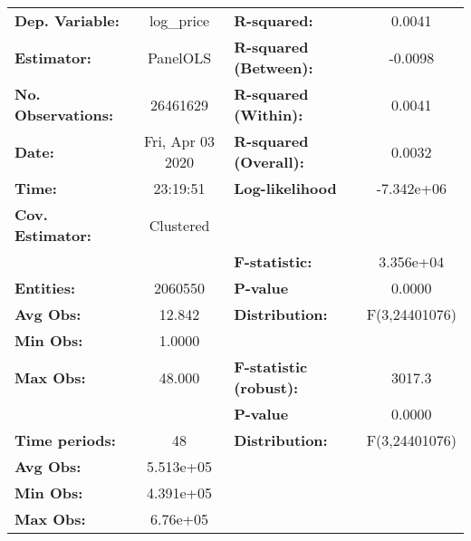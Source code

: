 \documentclass{report}
\begin{document}
\begin{center}
\begin{tabular}{lclc}
\toprule
\textbf{Dep. Variable:}      &     log\_price     & \textbf{  R-squared:         }   &      0.0041      \\
\textbf{Estimator:}          &      PanelOLS      & \textbf{  R-squared (Between):}  &     -0.0098      \\
\textbf{No. Observations:}   &      26461629      & \textbf{  R-squared (Within):}   &      0.0041      \\
\textbf{Date:}               &  Fri, Apr 03 2020  & \textbf{  R-squared (Overall):}  &      0.0032      \\
\textbf{Time:}               &      23:19:51      & \textbf{  Log-likelihood     }   &    -7.342e+06    \\
\textbf{Cov. Estimator:}     &     Clustered      & \textbf{                     }   &                  \\
\textbf{}                    &                    & \textbf{  F-statistic:       }   &    3.356e+04     \\
\textbf{Entities:}           &      2060550       & \textbf{  P-value            }   &      0.0000      \\
\textbf{Avg Obs:}            &       12.842       & \textbf{  Distribution:      }   &  F(3,24401076)   \\
\textbf{Min Obs:}            &       1.0000       & \textbf{                     }   &                  \\
\textbf{Max Obs:}            &       48.000       & \textbf{  F-statistic (robust):} &      3017.3      \\
\textbf{}                    &                    & \textbf{  P-value            }   &      0.0000      \\
\textbf{Time periods:}       &         48         & \textbf{  Distribution:      }   &  F(3,24401076)   \\
\textbf{Avg Obs:}            &     5.513e+05      & \textbf{                     }   &                  \\
\textbf{Min Obs:}            &     4.391e+05      & \textbf{                     }   &                  \\
\textbf{Max Obs:}            &      6.76e+05      & \textbf{                     }   &                  \\
\bottomrule
\end{tabular}
\begin{tabular}{lcccccc}

\end{tabular}
\end{center}
\end{document}
